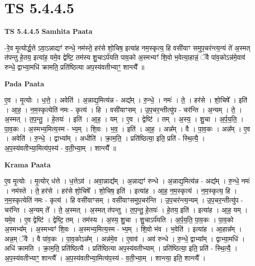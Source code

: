\documentclass[17pt]{extarticle}
\begin{document}
\section{ TS 5.4.4.5 }

\textbf{TS 5.4.4.5 } \newline
\textbf{Samhita Paata} \newline

-रे॒व मृ॒त्योर्द्ध॒त्ते ऽवा॒ऽन्नाद्यꣳ॑ रुन्धे॒ नम॑स्ते॒ हर॑से शो॒चिष॒ इत्या॑ह नम॒स्कृत्य॒ हि वसी॑याꣳ समुप॒चर॑न्त्य॒न्यं ते॑ अ॒स्मत् त॑पन्तु हे॒तय॒ इत्या॑ह॒ यमे॒व द्वेष्टि॒ तम॑स्य शु॒चाऽर्प॑यति पाव॒को अ॒स्मभ्यꣳ॑ शि॒वो भ॒वेत्या॒हान्नं॒ ॅवै पा॑व॒कोऽन्न॑मे॒वाव॑ रुन्धे॒ द्वाभ्या॒मधि॑ क्रामति॒ प्रति॑ष्ठित्या अप॒स्य॑वतीभ्याꣳ॒॒ शान्त्यै᳚ ॥ \newline

\textbf{Pada Paata} \newline

ए॒व । मृ॒त्योः । ध॒त्ते॒ । अवेति॑ । अ॒न्नाद्य॒मित्य॑न्न - अद्य᳚म् । रु॒न्धे॒ । नमः॑ । ते॒ । हर॑से । शो॒चिषे᳚ । इति॑ । आ॒ह॒ । न॒म॒स्कृत्येति॑ नमः - कृत्य॑ । हि । वसी॑याꣳसम् । उ॒प॒चर॒न्तीत्यु॑प - चर॑न्ति । अ॒न्यम् । ते॒ । अ॒स्मत् । त॒प॒न्तु॒ । हे॒तयः॑ । इति॑ । आ॒ह॒ । यम् । ए॒व । द्वेष्टि॑ । तम् । अ॒स्य॒ । शु॒चा । अ॒र्प॒य॒ति॒ । पा॒व॒कः । अ॒स्मभ्य॒मित्य॒स्म - भ्य॒म् । शि॒वः । भ॒व॒ । इति॑ । आ॒ह॒ । अन्न᳚म् । वै । पा॒व॒कः । अन्न᳚म् । ए॒व । अवेति॑ । रु॒न्धे॒ । द्वाभ्या᳚म् । अधीति॑ । क्रा॒म॒ति॒ । प्रति॑ष्ठित्या॒ इति॒ प्रति॑ - स्थि॒त्यै॒ । अ॒प॒स्य॑वतीभ्या॒मित्य॑प॒स्य॑ - व॒ती॒भ्या॒म् । शान्त्यै᳚ ॥  \newline


\textbf{Krama Paata} \newline

ए॒व मृ॒त्योः । मृ॒त्योर् ध॑त्ते । ध॒त्तेऽव॑ । अवा॒न्नाद्य᳚म् । अ॒न्नाद्यꣳ॑ रुन्धे । अ॒न्नाद्य॒मित्य॑न्न - अद्य᳚म् । रु॒न्धे॒ नमः॑ । नम॑स्ते । ते॒ हर॑से । हर॑से शो॒चिषे᳚ । शो॒चिष॒ इति॑ । इत्या॑ह । आ॒ह॒ न॒म॒स्कृत्य॑ । न॒म॒स्कृत्य॒ हि । न॒म॒स्कृत्येति॑ नमः - कृत्य॑ । हि वसी॑याꣳसम् । वसी॑याꣳसमुप॒चर॑न्ति । उ॒प॒चर॑न्त्य॒न्यम् । उ॒प॒चर॒न्तीत्यु॑प - चर॑न्ति । अ॒न्यम् ते᳚ । ते॒ अ॒स्मत् । अ॒स्मत् त॑पन्तु । त॒प॒न्तु॒ हे॒तयः॑ । हे॒तय॒ इति॑ । इत्या॑ह । आ॒ह॒ यम् । यमे॒व । ए॒व द्वेष्टि॑ । द्वेष्टि॒ तम् । तम॑स्य । अ॒स्य॒ शु॒चा । शु॒चाऽर्प॑यति । अ॒र्प॒य॒ति॒ पा॒व॒कः । पा॒व॒को अ॒स्मभ्य᳚म् । अ॒स्मभ्यꣳ॑ शि॒वः । अ॒स्मभ्य॒मित्य॒स्म - भ्य॒म् । शि॒वो भ॑व । भ॒वेति॑ । इत्या॑ह । आ॒हान्न᳚म् । अन्न॒म् ॅवै । वै पा॑व॒कः । पा॒व॒कोऽन्न᳚म् । अन्न॑मे॒व । ए॒वाव॑ । अव॑ रुन्धे । रु॒न्धे॒ द्वाभ्या᳚म् । द्वाभ्या॒मधि॑ । अधि॑ क्रामति । क्रा॒म॒ति॒ प्रति॑ष्ठित्यै । प्रति॑ष्ठित्या अप॒स्य॑वतीभ्याम् । प्रति॑ष्ठित्या॒ इति॒ प्रति॑ - स्थि॒त्यै॒ । अ॒प॒स्य॑वतीभ्याꣳ॒॒ शान्त्यै᳚ । अ॒प॒स्य॑वतीभ्या॒मित्य॑प॒स्य॑ - व॒ती॒भ्या॒म् । शान्त्या॒ इति॒ शान्त्यै᳚ । \newline
\end{document}
